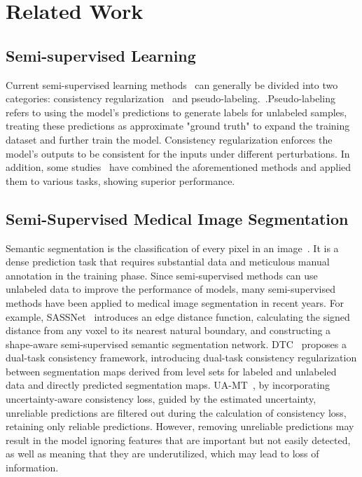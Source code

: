 \section{Related Work}
\subsection{Semi-supervised Learning}
Current semi-supervised learning methods~\cite{van2020survey} can generally be divided into two categories: consistency regularization~\cite{laine2016temporal,ouali2020semi} and pseudo-labeling.~\cite{chen2021semi,lee2013pseudo,qiao2018deep}.Pseudo-labeling refers to using the model's predictions to generate labels for unlabeled samples, treating these predictions as approximate "ground truth" to expand the training dataset and further train the model. Consistency regularization enforces the model’s outputs to be consistent for the inputs under different perturbations. In addition, some studies~\cite{lu2023mutually,lu2023uncertainty} have combined the aforementioned methods and applied them to various tasks, showing superior performance.

\subsection{Semi-Supervised Medical Image Segmentation}
Semantic segmentation is the classification of every pixel in an image~\cite{hao2020brief,mo2022review}. It is a dense prediction task that requires substantial data and meticulous manual annotation in the training phase. Since semi-supervised methods can use unlabeled data to improve the performance of models, many semi-supervised methods have been applied to medical image segmentation in recent years. For example, SASSNet~\cite{li2020shape} introduces an edge distance function, calculating the signed distance from any voxel to its nearest natural boundary, and constructing a shape-aware semi-supervised semantic segmentation network. DTC~\cite{luo2021semi} proposes a dual-task consistency framework, introducing dual-task consistency regularization between segmentation maps derived from level sets for labeled and unlabeled data and directly predicted segmentation maps. UA-MT~\cite{yu2019uncertainty}, by incorporating uncertainty-aware consistency loss, guided by the estimated uncertainty, unreliable predictions are filtered out during the calculation of consistency loss, retaining only reliable predictions. However, removing unreliable predictions may result in the model ignoring features that are important but not easily detected, as well as meaning that they are underutilized, which may lead to loss of information.



